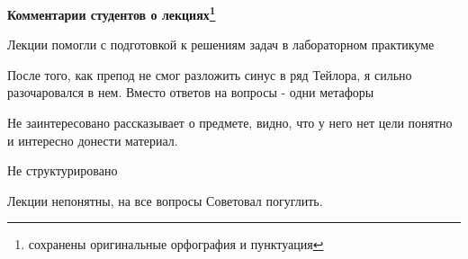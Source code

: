 		\textbf{Комментарии студентов о лекциях\protect\footnote{сохранены оригинальные орфография и пунктуация}}
            \begin{commentbox} 
                Лекции помогли с подготовкой к решениям задач в лабораторном практикуме   
            \end{commentbox} 
        
            \begin{commentbox} 
                После того, как препод не смог разложить синус в ряд Тейлора, я сильно разочаровался в нем. Вместо ответов на вопросы - одни метафоры
            \end{commentbox} 
        
            \begin{commentbox} 
                Не заинтересовано рассказывает о предмете, видно, что у него нет цели понятно и интересно донести материал. 
            \end{commentbox} 
        
            \begin{commentbox} 
                Не структурировано 
            \end{commentbox} 
        
            \begin{commentbox} 
                Лекции непонятны, на все вопросы Советовал погуглить. 
            \end{commentbox}  
    

